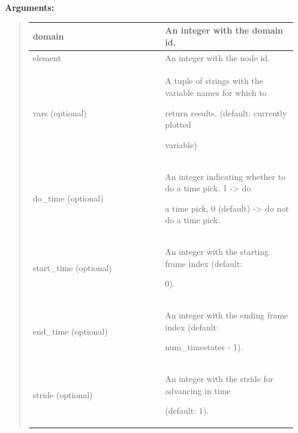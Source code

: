 \documentclass[letterpaper,10pt,english]{sphinxmanual}
\begin{document}
\begin{DUlineblock}{0em}
\item[] 
\item[] \textbf{Arguments:}
\end{DUlineblock}
\begin{quote}

\begin{tabular}{|p{0.475\linewidth}|p{0.475\linewidth}|}
\hline

domain
 & 
An integer with the domain id.
\\
\hline
element
 & 
An integer with the node id.
\\
\hline
vars (optional)
 & 
\begin{DUlineblock}{0em}
\item[] A tuple of strings with the variable names for which to
\item[] return results. (default: currently plotted
\item[] variable)
\end{DUlineblock}
\\
\hline
do\_time (optional)
 & 
\begin{DUlineblock}{0em}
\item[] An integer indicating whether to do a time pick. 1 -\textgreater{} do
\item[] a time pick, 0 (default) -\textgreater{} do not do a time pick.
\end{DUlineblock}
\\
\hline
start\_time (optional)
 & 
\begin{DUlineblock}{0em}
\item[] An integer with the starting frame index (default:
\item[] 0).
\end{DUlineblock}
\\
\hline
end\_time (optional)
 & 
\begin{DUlineblock}{0em}
\item[] An integer with the ending frame index (default:
\item[] num\_timestates - 1).
\end{DUlineblock}
\\
\hline
stride (optional)
 & 
\begin{DUlineblock}{0em}
\item[] An integer with the stride for advancing in time
\item[] (default: 1).
\end{DUlineblock}
\\

\end{tabular}
\end{quote}
\end{document}
